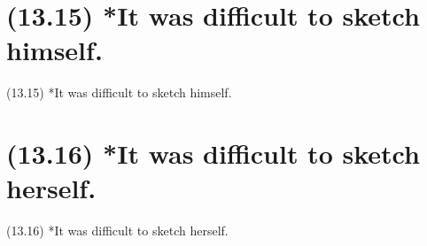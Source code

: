 \documentclass{article}
\begin{document}
\clearpage

%
%

\section*{(13.15) *It was difficult to sketch himself.}

\bigbreak
\begin{enumerate*}
\item[(13.15)] *It was difficult to sketch himself.
\end{enumerate*}
\bigbreak

\bigbreak
\begin{minipage}{\textwidth}
\end{minipage}
\bigbreak

\clearpage

%
%

\section*{(13.16) *It was difficult to sketch herself.}

\bigbreak
\begin{enumerate*}
\item[(13.16)] *It was difficult to sketch herself.
\end{enumerate*}
\bigbreak

\bigbreak
\begin{minipage}{\textwidth}
\end{minipage}
\bigbreak
\end{document}
